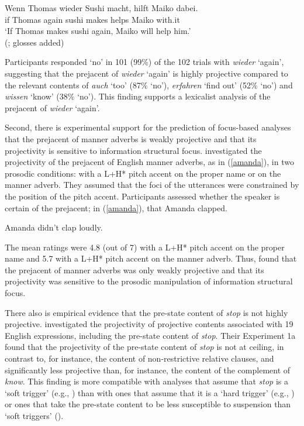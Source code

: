 \documentclass[a4paper,12pt]{article}
\newcommand{\6}{\mbox{$[\hspace*{-.6mm}[$}}
\newcommand{\9}{\mbox{$]\hspace*{-.6mm}]$}}
\begin{document}
\begin{exe}
\ex\label{thomas} \gll Wenn Thomas wieder Sushi macht, hilft Maiko dabei. \\ if Thomas again sushi makes helps Maiko with.it \\ \glt `If Thomas  makes sushi again, Maiko will help him.' \\ \hspace*{.2cm} \hfill (\citealt[176]{xue-onea11}; glosses added)
\end{exe}
Participants responded `no' in 101 (99\%) of the 102 trials with {\em wieder} `again', suggesting that the prejacent of {\em wieder} `again' is highly projective compared to the relevant contents of {\em auch} `too' (87\% `no'), {\em erfahren} `find out' (52\% `no') and {\em wissen} `know' (38\% `no'). This finding supports a lexicalist analysis of the prejacent of {\em wieder} `again'.

Second, there is experimental support for the prediction of focus-based analyses that the prejacent of manner adverbs is weakly projective and that its projectivity is sensitive to information structural focus. \citet*{stevens-etal2017} investigated the projectivity of the prejacent of English manner adverbs, as in (\ref{amanda}), in two prosodic conditions: with a L+H* pitch accent on the proper name or on the manner adverb. They assumed that the foci of the utterances were constrained by the position of the pitch accent. Participants assessed whether the speaker is certain of the prejacent; in (\ref{amanda}), that Amanda clapped.

\begin{exe}
\ex\label{amanda} Amanda didn't clap loudly.
\end{exe}
The mean ratings were 4.8 (out of 7) with a L+H* pitch accent on the proper name and 5.7 with a L+H* pitch accent on the manner adverb. Thus, \citet{stevens-etal2017} found that the prejacent of manner adverbs was only weakly projective and that its projectivity was sensitive to the prosodic manipulation of information structural focus. 

There also is empirical evidence that the pre-state content of {\em stop} is not highly projective. \citet{tbd-variability} investigated the projectivity of  projective contents associated with 19 English expressions, including the pre-state content of {\em stop}. Their Experiment 1a found that the projectivity of the pre-state content of {\em stop} is not at ceiling, in contrast to, for instance, the content of non-restrictive relative clauses, and significantly less projective than, for instance, the content of the complement of {\em know}. This finding is more compatible with analyses that assume that {\em stop} is a `soft trigger' (e.g., \citealt{simons01,abusch02,abusch10,romoli2011,romoli2015}) than with ones that assume that it is a `hard trigger' (e.g., \citealt{kadmon01}) or ones that take the pre-state content to be less susceptible to suspension than `soft triggers' (\citealt{abrusan2016}).
\end{document}
